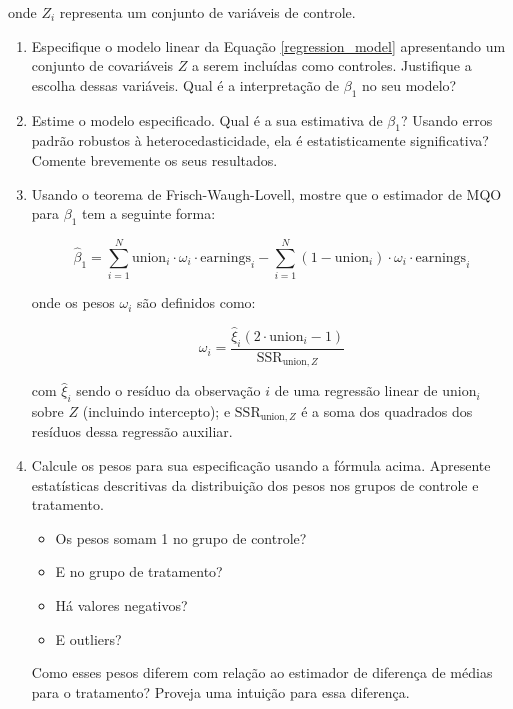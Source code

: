 \documentclass[10pt,a4paper]{article}
\begin{document}
\begin{enumerate}[label=\roman*]
 	onde $Z_i$ representa um conjunto de variáveis de controle.
 	
 	\begin{enumerate}
 		\item[a)] Especifique o modelo linear da Equação \eqref{regression_model} apresentando um conjunto de covariáveis $Z$ a serem incluídas como controles. Justifique a escolha dessas variáveis. Qual é a interpretação de $\beta_1$ no seu modelo?
 		
 		\item[b)] Estime o modelo especificado. Qual é a sua estimativa de $\beta_1$? Usando erros padrão robustos à heterocedasticidade, ela é estatisticamente significativa? Comente brevemente os seus resultados.
 		
 		
 		\item[c)]Usando o teorema de Frisch-Waugh-Lovell, mostre que o estimador de MQO para $\beta_1$ tem a seguinte forma:
 		
 		\begin{equation}
 			\hat{\beta}_1 = \sum_{i=1}^N  \text{union}_i \cdot \omega_i  \cdot \text{earnings}_i -  \sum_{i=1}^N (1-  \text{union}_i )\cdot \omega_i  \cdot \text{earnings}_i 
 		\end{equation}
 		
 		onde os pesos $\omega_i$ são definidos como:
 		
 		\begin{equation}
 			\omega_i  = \frac{\hat{\xi}_i (2 \cdot \text{union}_i-1)}{\text{SSR}_{\text{union},Z}}
 		\end{equation}
 		
 		com $\hat{\xi}_i$ sendo o resíduo da observação $i$ de uma regressão linear de $\text{union}_i$ sobre $Z$ (incluindo intercepto); e $\text{SSR}_{\text{union},Z}$ é a soma dos quadrados dos resíduos dessa regressão auxiliar.
 		
 		\item[d)] Calcule os pesos para sua especificação usando a fórmula acima. Apresente estatísticas descritivas da distribuição dos pesos nos grupos de controle e tratamento. 
 		
 		\begin{itemize}
 			\item Os pesos somam 1 no grupo de controle?
 			\item E no grupo de tratamento?
 			\item Há valores negativos?
 			\item E outliers?
 		\end{itemize}
 		
 		Como esses pesos diferem com relação ao estimador de diferença de médias para o tratamento? Proveja uma intuição para essa diferença.
 		
 	\end{enumerate}
 	
 \end{enumerate}
 
\end{document}
